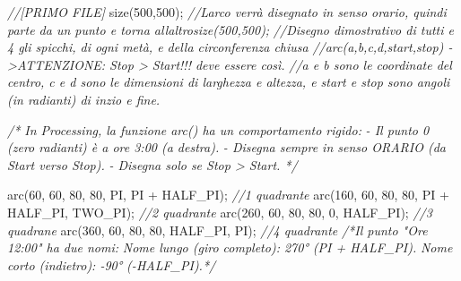 \documentclass[
]{article}
\newenvironment{Shaded}{}{}
\newcommand{\CommentTok}[1]{\textcolor[rgb]{0.38,0.63,0.69}{\textit{#1}}}
\newcommand{\DecValTok}[1]{\textcolor[rgb]{0.25,0.63,0.44}{#1}}
\newcommand{\FunctionTok}[1]{\textcolor[rgb]{0.02,0.16,0.49}{#1}}
\newcommand{\NormalTok}[1]{#1}
\newcommand{\OperatorTok}[1]{\textcolor[rgb]{0.40,0.40,0.40}{#1}}
\begin{document}
\begin{Shaded}
\begin{Highlighting}[]
\CommentTok{//[PRIMO FILE]}
\FunctionTok{size}\OperatorTok{(}\DecValTok{500}\OperatorTok{,}\DecValTok{500}\OperatorTok{);}
\CommentTok{//L\textquotesingle{}arco verrà disegnato in senso orario, quindi parte da un punto e torna all\textquotesingle{}altrosize(500,500);}
\CommentTok{//Disegno dimostrativo di tutti e 4 gli spicchi, di ogni metà, e della circonferenza chiusa}
\CommentTok{//arc(a,b,c,d,start,stop) {-}\textgreater{}ATTENZIONE: Stop \textgreater{} Start!!! deve essere così.}
\CommentTok{//a e b sono le coordinate del centro, c e d sono le dimensioni di larghezza e altezza, e start e stop sono angoli (in radianti) di inzio e fine.}

\CommentTok{/* In Processing, la funzione arc() ha un comportamento rigido:}
\CommentTok{{-} Il punto 0 (zero radianti) è a ore 3:00 (a destra).}
\CommentTok{{-} Disegna sempre in senso ORARIO (da Start verso Stop).}
\CommentTok{{-} Disegna solo se Stop \textgreater{} Start. */}

\FunctionTok{arc}\OperatorTok{(}\DecValTok{60}\OperatorTok{,} \DecValTok{60}\OperatorTok{,} \DecValTok{80}\OperatorTok{,} \DecValTok{80}\OperatorTok{,}\NormalTok{ PI}\OperatorTok{,}\NormalTok{ PI }\OperatorTok{+}\NormalTok{ HALF\_PI}\OperatorTok{);} \CommentTok{//1 quadrante}
\FunctionTok{arc}\OperatorTok{(}\DecValTok{160}\OperatorTok{,} \DecValTok{60}\OperatorTok{,} \DecValTok{80}\OperatorTok{,} \DecValTok{80}\OperatorTok{,}\NormalTok{ PI }\OperatorTok{+}\NormalTok{ HALF\_PI}\OperatorTok{,}\NormalTok{ TWO\_PI}\OperatorTok{);} \CommentTok{//2 quadrante}
\FunctionTok{arc}\OperatorTok{(}\DecValTok{260}\OperatorTok{,} \DecValTok{60}\OperatorTok{,} \DecValTok{80}\OperatorTok{,} \DecValTok{80}\OperatorTok{,} \DecValTok{0}\OperatorTok{,}\NormalTok{ HALF\_PI}\OperatorTok{);} \CommentTok{//3 quadrane}
\FunctionTok{arc}\OperatorTok{(}\DecValTok{360}\OperatorTok{,} \DecValTok{60}\OperatorTok{,} \DecValTok{80}\OperatorTok{,} \DecValTok{80}\OperatorTok{,}\NormalTok{ HALF\_PI}\OperatorTok{,}\NormalTok{ PI}\OperatorTok{);} \CommentTok{//4 quadrante}
\CommentTok{/*Il punto "Ore 12:00" ha due nomi:}
\CommentTok{Nome lungo (giro completo): 270° (PI + HALF\_PI).}
\CommentTok{Nome corto (indietro): {-}90° ({-}HALF\_PI).*/}



\end{Highlighting}
\end{Shaded}
\end{document}

